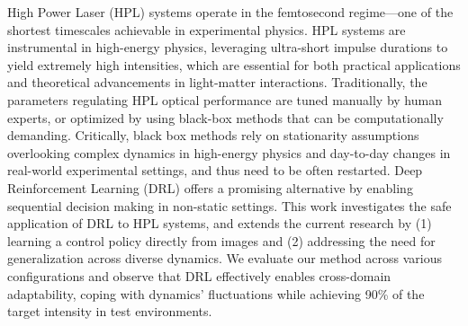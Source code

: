 High Power Laser (HPL) systems operate in the femtosecond regime—one of the shortest timescales achievable in experimental physics. 
HPL systems are instrumental in high-energy physics, leveraging ultra-short impulse durations to yield extremely high intensities, which are essential for both practical applications and theoretical advancements in light-matter interactions. Traditionally, the parameters regulating HPL optical performance are tuned manually by human experts, or optimized by using black-box methods that can be computationally demanding. Critically, black box methods rely on stationarity assumptions overlooking complex dynamics in high-energy physics and day-to-day changes in real-world experimental settings, and thus need to be often restarted. Deep Reinforcement Learning (DRL) offers a promising alternative by enabling sequential decision making in non-static settings. This work investigates the safe application of DRL to HPL systems, and extends the current research by (1) learning a control policy directly from images and (2) addressing the need for generalization across diverse dynamics. We evaluate our method across various configurations and observe that DRL effectively enables cross-domain adaptability, coping with dynamics' fluctuations while achieving 90\% of the target intensity in test environments.